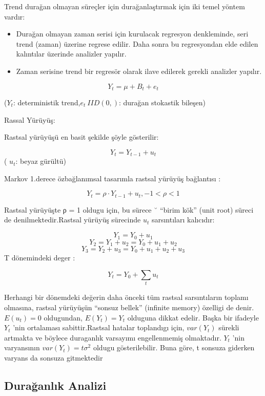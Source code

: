 \documentclass[11pt]{article}
\providecommand{\tightlist}{%
      \setlength{\itemsep}{0pt}\setlength{\parskip}{0pt}}
\begin{document}
Trend durağan olmayan süreçler için durağanlaştırmak için iki temel
yöntem vardır:

\begin{itemize}
\tightlist
\item
  Durağan olmayan zaman serisi için kurulacak regresyon denkleminde,
  seri trend (zaman) üzerine regrese edilir. Daha sonra bu regresyondan
  elde edilen kalıntılar üzerinde analizler yapılır.
\item
  Zaman serisine trend bir regresör olarak ilave edilerek gerekli
  analizler yapılır.
\end{itemize}

\[Y_{t} = \mu + B_{t} + e_{t}\]

(\(Y_{t}\): deterministik trend,\(e_{t} ~ IID(0,)\): durağan stokastik
bileşen)

Rassal Yürüyüş:

Rastsal yürüyüşü en basit şekilde şöyle gösterilir:

\[ Y_{t} = Y_{t−1} + u_{t} \] ( \(u_{t}\): beyaz gürültü)

Markov 1.derece özbağlanımsal tasarımla rastsal yürüyüş bağlantısı :

\[ Y_{t} = ρ\cdot Y_{t−1} + u_{t}  ,  −1 < ρ < 1 \]

Rastsal yürüyüşte ρ = 1 oldugu için, bu sürece ˘ ``birim kök'' (unit
root) süreci de denilmektedir.Rastsal yürüyüş sürecinde \(u_{t}\)
sarsıntıları kalıcıdır:

\[ Y_{1} = Y_{0} + u_{1} \]
\[ Y_{2} = Y_{1} + u_{2} = Y_{0} + u_{1} + u_{2} \]
\[ Y_{3} = Y_{2} + u_{3} = Y_{0} + u_{1} + u_{2} + u_{3} \] T
dönemindeki deger :

\[ Y_{t} = Y_{0} + \sum_t u_{t}  \]

Herhangi bir dönemdeki değerin daha önceki tüm rastsal sarsıntıların
toplamı olmasına, rastsal yürüyüşün ``sonsuz bellek'' (infinite memory)
özelligi de denir. \(E(u_{t}) = 0\) oldugundan, \(E(Y_{t}) = Y_{t}\)
olduguna dikkat edelir. Başka bir ifadeyle \(Y_{t}\) 'nin ortalaması
sabittir.Rastsal hatalar toplandıgı için, \(var(Y_{t})\) sürekli
artmakta ve böylece duraganlık varsayımı engellenmemiş olmaktadır.
\(Y_{t}\) 'nin varyansının \(var(Y_{t}) = tσ^2\) oldugu gösterilebilir.
Buna göre, t sonsuza giderken varyans da sonsuza gitmektedir
\pagebreak
\subsection{Durağanlık Analizi}\label{duraux11fanlux131k-analizi}
\end{document}
